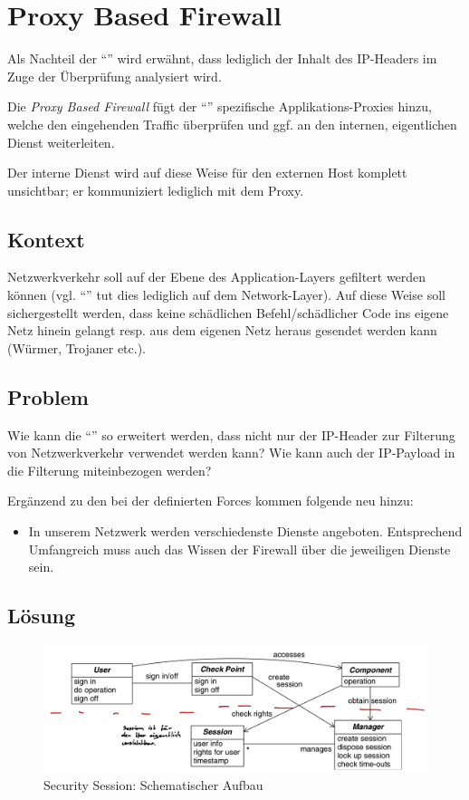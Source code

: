 \section{Proxy Based Firewall}
Als Nachteil der ``'' wird erwähnt, dass lediglich der Inhalt des IP-Headers im Zuge der Überprüfung analysiert wird.

Die \emph{Proxy Based Firewall} fügt der ``'' spezifische Applikations-Proxies hinzu, welche den eingehenden Traffic überprüfen und ggf. an den internen, eigentlichen Dienst weiterleiten.

Der interne Dienst wird auf diese Weise für den externen Host  komplett unsichtbar; er kommuniziert lediglich mit dem Proxy.


\subsection*{Kontext}
Netzwerkverkehr soll auf der Ebene des Application-Layers gefiltert werden können (vgl. ``'' tut dies lediglich auf dem Network-Layer). Auf diese Weise soll sichergestellt werden, dass keine schädlichen Befehl/schädlicher Code ins eigene Netz hinein gelangt resp. aus dem eigenen Netz heraus gesendet werden kann (Würmer, Trojaner etc.).

\subsection*{Problem}
Wie kann die ``'' so erweitert werden, dass nicht nur der IP-Header zur Filterung von Netzwerkverkehr verwendet werden kann? Wie kann auch der IP-Payload in die Filterung miteinbezogen werden?

Ergänzend zu den bei der  definierten Forces kommen folgende neu hinzu:

\begin{itemize}
	\item In unserem Netzwerk werden verschiedenste Dienste angeboten. Entsprechend Umfangreich muss auch das Wissen der Firewall über die jeweiligen Dienste sein.
\end{itemize}


\subsection*{Lösung}

\begin{figure}[H]
	\includegraphics[width=\textwidth]{content/system-access-control-architecture/images/security-session-structure.png}
	\caption{Security Session: Schematischer Aufbau \cite{SecPatterns06}}
\end{figure}


